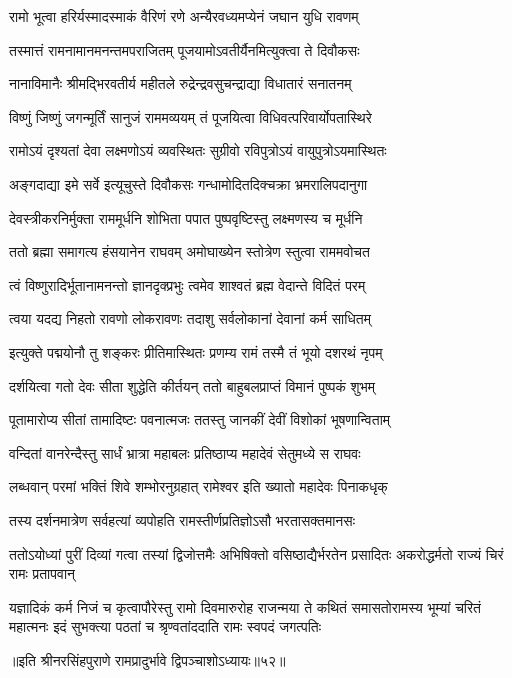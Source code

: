 \twolineshloka
{रामो भूत्वा हरिर्यस्मादस्माकं वैरिणं रणे}
{अन्यैरवध्यमप्येनं जघान युधि रावणम्} %

\twolineshloka
{तस्मात्तं रामनामानमनन्तमपराजितम्}
{पूजयामोऽवतीर्यैनमित्युक्त्वा ते दिवौकसः} %

\twolineshloka
{नानाविमानैः श्रीमद्भिरवतीर्य महीतले}
{रुद्रेन्द्रवसुचन्द्राद्या विधातारं सनातनम्} %

\twolineshloka
{विष्णुं जिष्णुं जगन्मूर्तिं सानुजं राममव्ययम्}
{तं पूजयित्वा विधिवत्परिवार्योपतास्थिरे} %

\twolineshloka
{रामोऽयं दृश्यतां देवा लक्ष्मणोऽयं व्यवस्थितः}
{सुग्रीवो रविपुत्रोऽयं वायुपुत्रोऽयमास्थितः} %

\twolineshloka
{अङ्गदाद्या इमे सर्वे इत्यूचुस्ते दिवौकसः}
{गन्धामोदितदिक्चक्रा भ्रमरालिपदानुगा} %

\twolineshloka
{देवस्त्रीकरनिर्मुक्ता राममूर्धनि शोभिता}
{पपात पुष्पवृष्टिस्तु लक्ष्मणस्य च मूर्धनि} %

\twolineshloka
{ततो ब्रह्मा समागत्य हंसयानेन राघवम्}
{अमोघाख्येन स्तोत्रेण स्तुत्वा राममवोचत} %


\twolineshloka
{त्वं विष्णुरादिर्भूतानामनन्तो ज्ञानदृक्प्रभुः}
{त्वमेव शाश्वतं ब्रह्म वेदान्ते विदितं परम्} %

\twolineshloka
{त्वया यदद्य निहतो रावणो लोकरावणः}
{तदाशु सर्वलोकानां देवानां कर्म साधितम्} %

\twolineshloka
{इत्युक्ते पद्मयोनौ तु शङ्करः प्रीतिमास्थितः}
{प्रणम्य रामं तस्मै तं भूयो दशरथं नृपम्} %

\twolineshloka
{दर्शयित्वा गतो देवः सीता शुद्धेति कीर्तयन्}
{ततो बाहुबलप्राप्तं विमानं पुष्पकं शुभम्} %

\twolineshloka
{पूतामारोप्य सीतां तामादिष्टः पवनात्मजः}
{ततस्तु जानकीं देवीं विशोकां भूषणान्विताम्} %

\twolineshloka
{वन्दितां वानरेन्दैस्तु सार्धं भ्रात्रा महाबलः}
{प्रतिष्ठाप्य महादेवं सेतुमध्ये स राघवः} %

\twolineshloka
{लब्धवान् परमां भक्तिं शिवे शम्भोरनुग्रहात्}
{रामेश्वर इति ख्यातो महादेवः पिनाकधृक्} %

\twolineshloka
{तस्य दर्शनमात्रेण सर्वहत्यां व्यपोहति}
{रामस्तीर्णप्रतिज्ञोऽसौ भरतासक्तमानसः} %

\threelineshloka
{ततोऽयोध्यां पुरीं दिव्यां गत्वा तस्यां द्विजोत्तमैः}
{अभिषिक्तो वसिष्ठाद्यैर्भरतेन प्रसादितः}
{अकरोद्धर्मतो राज्यं चिरं रामः प्रतापवान्} %

\sixlineindentedshloka
{यज्ञादिकं कर्म निजं च कृत्वा}{पौरेस्तु रामो दिवमारुरोह}
{राजन्मया ते कथितं समासतो}{रामस्य भूम्यां चरितं महात्मनः}
{इदं सुभक्त्या पठतां च श्रृण्वतां}{ददाति रामः स्वपदं जगत्पतिः} %

॥इति श्रीनरसिंहपुराणे रामप्रादुर्भावे द्विपञ्चाशोऽध्यायः॥५२॥

\closesection
